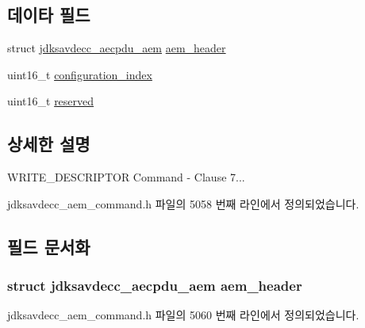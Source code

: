 \subsection*{데이타 필드}
\begin{DoxyCompactItemize}
\item 
struct \hyperlink{structjdksavdecc__aecpdu__aem}{jdksavdecc\+\_\+aecpdu\+\_\+aem} \hyperlink{structjdksavdecc__aem__command__write__descriptor_ae1e77ccb75ff5021ad923221eab38294}{aem\+\_\+header}
\item 
uint16\+\_\+t \hyperlink{structjdksavdecc__aem__command__write__descriptor_afaad1bd7c66f9611e134d8c5ce98f444}{configuration\+\_\+index}
\item 
uint16\+\_\+t \hyperlink{structjdksavdecc__aem__command__write__descriptor_a5a6ed8c04a3db86066924b1a1bf4dad3}{reserved}
\end{DoxyCompactItemize}


\subsection{상세한 설명}
W\+R\+I\+T\+E\+\_\+\+D\+E\+S\+C\+R\+I\+P\+T\+OR Command -\/ Clause 7... 

jdksavdecc\+\_\+aem\+\_\+command.\+h 파일의 5058 번째 라인에서 정의되었습니다.



\subsection{필드 문서화}
\subsubsection[{\texorpdfstring{aem\+\_\+header}{aem_header}}]{\setlength{\rightskip}{0pt plus 5cm}struct {\bf jdksavdecc\+\_\+aecpdu\+\_\+aem} aem\+\_\+header}\hypertarget{structjdksavdecc__aem__command__write__descriptor_ae1e77ccb75ff5021ad923221eab38294}{}\label{structjdksavdecc__aem__command__write__descriptor_ae1e77ccb75ff5021ad923221eab38294}


jdksavdecc\+\_\+aem\+\_\+command.\+h 파일의 5060 번째 라인에서 정의되었습니다.

